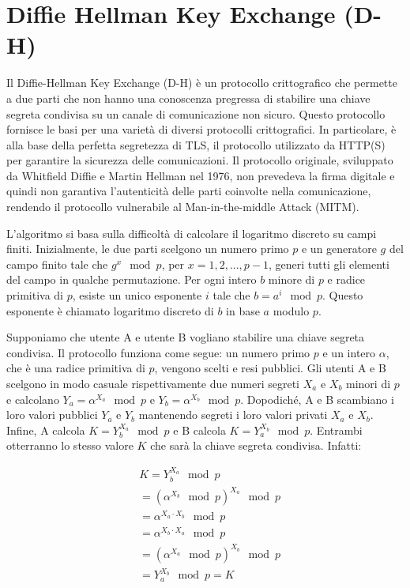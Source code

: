 \documentclass{article}
\begin{document}
\section{Diffie Hellman Key Exchange (D-H)}
Il Diffie-Hellman Key Exchange (D-H) è un protocollo crittografico che permette a due parti che non hanno una conoscenza pregressa di stabilire una chiave segreta condivisa su un canale di comunicazione non sicuro.
Questo protocollo fornisce le basi per una varietà di diversi protocolli crittografici. In particolare, è alla base della perfetta segretezza di TLS, il protocollo utilizzato da HTTP(S) per garantire la sicurezza delle comunicazioni.
Il protocollo originale, sviluppato da Whitfield Diffie e Martin Hellman nel 1976, non prevedeva la firma digitale e quindi non garantiva l'autenticità delle parti coinvolte nella comunicazione, rendendo il protocollo vulnerabile al Man-in-the-middle Attack (MITM).

L'algoritmo si basa sulla difficoltà di calcolare il logaritmo discreto su campi finiti.
Inizialmente, le due parti scelgono un numero primo $p$ e un generatore $g$ del campo finito tale che $g^x \mod p$, per $x = 1, 2, ..., p-1$, generi tutti gli elementi del campo in qualche permutazione.
Per ogni intero $b$ minore di $p$ e radice primitiva di $p$, esiste un unico esponente $i$ tale che $b = a^i \mod p$. Questo esponente è chiamato logaritmo discreto di $b$ in base $a$ modulo $p$.

Supponiamo che utente A e utente B vogliano stabilire una chiave segreta condivisa. Il protocollo funziona come segue:
un numero primo $p$ e un intero $\alpha$, che è una radice primitiva di $p$, vengono scelti e resi pubblici. Gli utenti A e B scelgono in modo casuale rispettivamente due numeri segreti $X_a$ e $X_b$ minori di $p$ e calcolano $Y_a = \alpha^{X_a} \mod p$ e $Y_b = \alpha^{X_b} \mod p$.
Dopodiché, A e B scambiano i loro valori pubblici $Y_a$ e $Y_b$ mantenendo segreti i loro valori privati $X_a$ e $X_b$.
Infine, A calcola $K = Y_b^{X_a} \mod p$ e B calcola $K = Y_a^{X_b} \mod p$. Entrambi otterranno lo stesso valore $K$ che sarà la chiave segreta condivisa.
Infatti:

\begin{equation}
	\begin{aligned}
		&K = Y_b^{X_a} \mod p \\
		&= (\alpha^{X_b} \mod p)^{X_a} \mod p \\
		&= \alpha^{X_a \cdot X_b} \mod p \\
		&= \alpha^{X_b \cdot X_a} \mod p \\
		&= (\alpha^{X_a} \mod p)^{X_b} \mod p \\
		&= Y_a^{X_b} \mod p = K
	\end{aligned}
\end{equation}
\end{document}

